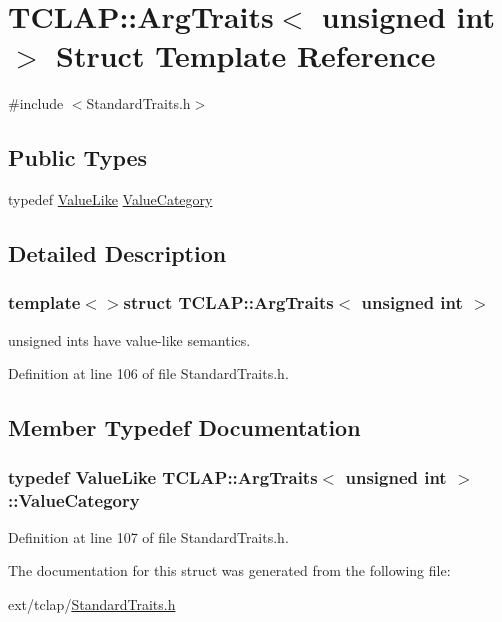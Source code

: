 \hypertarget{struct_t_c_l_a_p_1_1_arg_traits_3_01unsigned_01int_01_4}{}\section{T\+C\+L\+A\+P\+:\+:Arg\+Traits$<$ unsigned int $>$ Struct Template Reference}
\label{struct_t_c_l_a_p_1_1_arg_traits_3_01unsigned_01int_01_4}


{\ttfamily \#include $<$Standard\+Traits.\+h$>$}

\subsection*{Public Types}
\begin{DoxyCompactItemize}
\item 
typedef \hyperlink{struct_t_c_l_a_p_1_1_value_like}{Value\+Like} \hyperlink{struct_t_c_l_a_p_1_1_arg_traits_3_01unsigned_01int_01_4_ae95cdc132665581c458fc64c7e7a0490}{Value\+Category}
\end{DoxyCompactItemize}


\subsection{Detailed Description}
\subsubsection*{template$<$$>$struct T\+C\+L\+A\+P\+::\+Arg\+Traits$<$ unsigned int $>$}

unsigned ints have value-\/like semantics. 

Definition at line 106 of file Standard\+Traits.\+h.



\subsection{Member Typedef Documentation}
\hypertarget{struct_t_c_l_a_p_1_1_arg_traits_3_01unsigned_01int_01_4_ae95cdc132665581c458fc64c7e7a0490}{}
\subsubsection[{Value\+Category}]{\setlength{\rightskip}{0pt plus 5cm}typedef {\bf Value\+Like} {\bf T\+C\+L\+A\+P\+::\+Arg\+Traits}$<$ unsigned int $>$\+::{\bf Value\+Category}}\label{struct_t_c_l_a_p_1_1_arg_traits_3_01unsigned_01int_01_4_ae95cdc132665581c458fc64c7e7a0490}


Definition at line 107 of file Standard\+Traits.\+h.



The documentation for this struct was generated from the following file\+:\begin{DoxyCompactItemize}
\item 
ext/tclap/\hyperlink{_standard_traits_8h}{Standard\+Traits.\+h}\end{DoxyCompactItemize}
